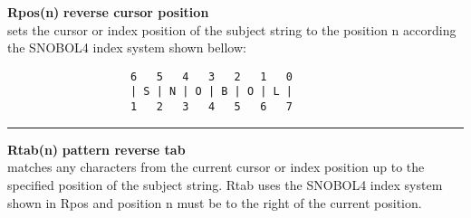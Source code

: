 \documentclass{article}
\begin{document}
\noindent\textbf{Rpos(n)} \hfill\textbf{reverse cursor position}\\
sets the cursor or index position of the subject string to the position n according the SNOBOL4 index system shown bellow:
\begin{verbatim}
                   6   5   4   3   2   1   0
                   | S | N | O | B | O | L |
                   1   2   3   4   5   6   7
\end{verbatim}
\noindent\rule{12cm}{0.1pt}

\noindent\textbf{Rtab(n)} \hfill\textbf{pattern reverse tab}\\
matches any characters from the current cursor or index position up to the specified position of the subject string. Rtab uses the SNOBOL4 index system shown in Rpos and position n must be to the right of the current position.\\


\newpage


\end{document}
